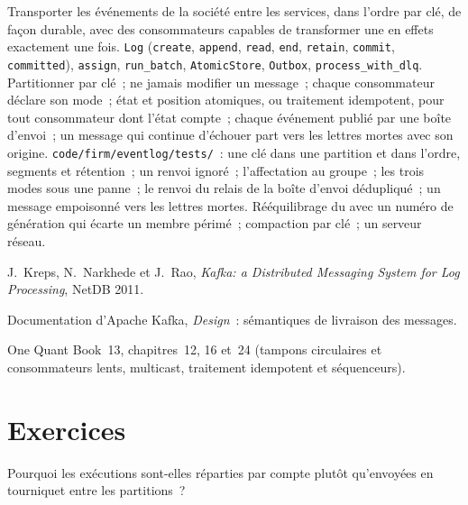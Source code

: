 \begin{build}
 Transporter les événements de la société entre les services, dans l'ordre par clé, de façon durable, avec des consommateurs capables de transformer une  en effets exactement une fois.
 \texttt{Log} (\texttt{create}, \texttt{append}, \texttt{read}, \texttt{end}, \texttt{retain}, \texttt{commit},
\texttt{committed}), \texttt{assign}, \texttt{run\_batch}, \texttt{AtomicStore}, \texttt{Outbox}, \texttt{process\_with\_dlq}.
 Partitionner par clé~; ne jamais modifier un message~; chaque consommateur déclare son mode~; état et position atomiques, ou traitement idempotent,
pour tout consommateur dont l'état compte~; chaque événement publié par une boîte d'envoi~; un message qui continue d'échouer part vers les lettres mortes avec son
origine.
 \texttt{code/firm/eventlog/tests/}~: une clé dans une partition et dans l'ordre, segments et rétention~; un renvoi
ignoré~; l'affectation au groupe~; les trois modes sous une panne~; le renvoi du relais de la boîte d'envoi dédupliqué~; un message empoisonné vers les lettres mortes.
 Rééquilibrage du  avec un numéro de génération qui écarte un membre périmé~; compaction par clé~; un serveur réseau.
\end{build}

\begin{omsources}
\item J.~Kreps, N.~Narkhede et J.~Rao, \emph{Kafka: a Distributed Messaging System for Log Processing}, NetDB 2011.
\item Documentation d'Apache Kafka, \emph{Design}~: sémantiques de livraison des messages.
\item One Quant Book~13, chapitres~12, 16 et~24 (tampons circulaires et consommateurs lents, multicast, traitement idempotent et séquenceurs).
\end{omsources}

\section{Exercices}

\begin{exercise}[$\star$]\label{exo:pl:messaging-and-event-driven-architecture:1}
Pourquoi les exécutions sont-elles réparties par compte plutôt qu'envoyées en tourniquet entre les partitions~?
\end{exercise}

